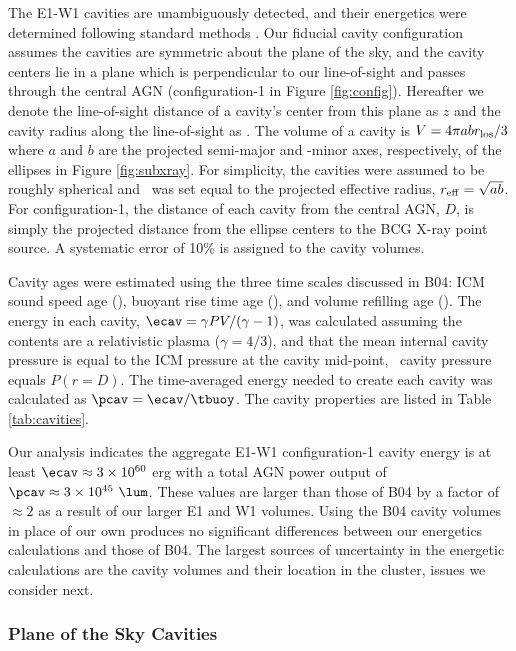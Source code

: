 \documentclass[iop]{emulateapj}
\begin{document}
The E1-W1 cavities are unambiguously detected, and their energetics
were determined following standard methods \citep[see][for a
  review]{mcnamrev}. Our fiducial cavity configuration assumes the
cavities are symmetric about the plane of the sky, and the cavity
centers lie in a plane which is perpendicular to our line-of-sight and
passes through the central AGN (configuration-1 in Figure
\ref{fig:config}). Hereafter we denote the line-of-sight distance of a
cavity's center from this plane as $z$ and the cavity radius along the
line-of-sight as \rlos. The volume of a cavity is $V = 4\pi a b
r_{\rm{los}}/3$ where $a$ and $b$ are the projected semi-major and -minor
axes, respectively, of the ellipses in Figure \ref{fig:subxray}. For
simplicity, the cavities were assumed to be roughly spherical and
\rlos\ was set equal to the projected effective radius, $r_{\rm{eff}} =
\sqrt{ab}$. For configuration-1, the distance of each cavity from the
central AGN, $D$, is simply the projected distance from the ellipse
centers to the BCG X-ray point source. A systematic error of 10\% is
assigned to the cavity volumes.

Cavity ages were estimated using the three time scales discussed in
B04: ICM sound speed age (\tsonic), buoyant rise time age (\tbuoy),
and volume refilling age (\trefill). The energy in each cavity, $\ecav
= \gamma PV/(\gamma-1)$, was calculated assuming the contents are a
relativistic plasma ($\gamma = 4/3$), and that the mean internal
cavity pressure is equal to the ICM pressure at the cavity mid-point,
\ie\ cavity pressure equals $P(r = D)$. The time-averaged energy
needed to create each cavity was calculated as $\pcav =
\ecav/\tbuoy$. The cavity properties are listed in Table
\ref{tab:cavities}.

Our analysis indicates the aggregate E1-W1 configuration-1 cavity
energy is at least $\ecav \approx 3 \times 10^{60}$ erg with a total
AGN power output of $\pcav \approx 3 \times 10^{45} ~\lum$. These
values are larger than those of B04 by a factor of $\approx 2$ as a
result of our larger E1 and W1 volumes. Using the B04 cavity volumes
in place of our own produces no significant differences between our
energetics calculations and those of B04. The largest sources of
uncertainty in the energetic calculations are the cavity volumes and
their location in the cluster, issues we consider next.

\subsubsection{Plane of the Sky Cavities}
\label{sec:dec}
\end{document}
